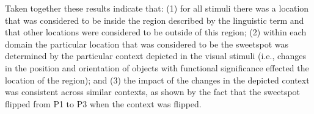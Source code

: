 \documentclass[11pt,letterpaper]{article}
\begin{document}



Taken together these results indicate that: (1) for all stimuli there was a location that was considered to be inside the region described by the linguistic term and that other locations were considered to be outside of this region; (2) within each domain the particular location that was considered to be the sweetspot was determined by the particular context depicted in the visual stimuli (i.e., changes in the position and orientation of objects with functional significance effected the location of the region); and (3) the impact of the changes in the depicted context was consistent across similar contexts, as shown by the fact that the sweetspot flipped from P1 to P3 when the context was flipped.
\end{document}
